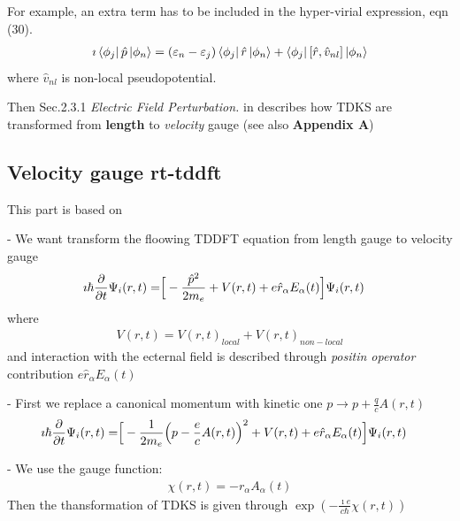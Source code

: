 \documentclass[11pt]{article}
\begin{document}
For example, an extra term has to be included in the hyper-virial expression, eqn (30).
\begin{align*}
    \imath \bra{\phi_j} \hat p \ket{\phi_n} = (\varepsilon_n -\varepsilon_j)  \bra{\phi_j} \hat r \ket{\phi_n}
    +  \bra{\phi_j} [\hat r, \hat v_{nl} ]   \ket{\phi_n}
\end{align*}
where $\hat v_{nl}$ is non-local pseudopotential.

Then  Sec.2.3.1 \emph{Electric Field Perturbation. } in \cite{Luber-rt-tddft}  describes how TDKS are transformed  from {\bf length} to \emph{ velocity } gauge  (see also {\bf Appendix A}) 

\newpage
\subsection{ Velocity gauge rt-tddft}
This part is based  on \cite{Luber-rt-tddft}

-  
We want  transform  the floowing  TDDFT  equation   from length gauge to  velocity gauge 
\begin{align*}
    \imath \hbar \pdv{}{t}\Psi_i (r,t)  =& \Big[-\frac{\hat p^2}{2m_e}  +V(r,t)  +e \hat r_\alpha  E_\alpha(t) \Big] \Psi_i(r,t) %
\end{align*}
where 
\begin{align*}
    V(r,t) = V(r,t)_{local} +  V(r,t)_{non-local} 
\end{align*}
and interaction with the ecternal field is described through \emph{positin operator}  contribution $e \hat r_\alpha  E_\alpha(t)$

- First we replace a canonical momentum with kinetic one $p \to p +\frac{q}{c} A(r,t)$
 \begin{align*}
    \imath \hbar \pdv{}{t}\Psi_i (r,t)  =& \Big[-\frac{1}{2m_e}  \Big( p - \frac{e}{c}A(r,t) \Big)^2  +V(r,t)  +e \hat r_\alpha  E_\alpha(t) \Big] \Psi_i(r,t) %
\end{align*}

-  We use the gauge function:
\begin{align*}
    \chi(r,t) =  - r_\alpha A_\alpha(t) 
\end{align*}
Then the  thansformation of TDKS  is given  through $\exp(- \frac{\imath e}{c \hbar} \chi(r,t) )$
\end{document}
